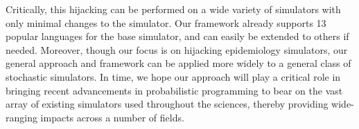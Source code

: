 \documentclass{article}
\begin{document}
Critically, this hijacking can be performed on a wide variety of simulators
with only minimal changes to the simulator.  Our framework already
supports 13 popular languages for the base simulator, and can easily
be extended to others if needed.  Moreover, though our focus
is on hijacking epidemiology simulators, our general approach and
framework can be applied more widely to a general class of stochastic
simulators.  In time, we hope our approach will play a critical role in
bringing recent advancements in probabilistic programming to bear on
the vast array of existing simulators used throughout the sciences,
thereby providing wide-ranging impacts across a number of fields.




\end{document}
